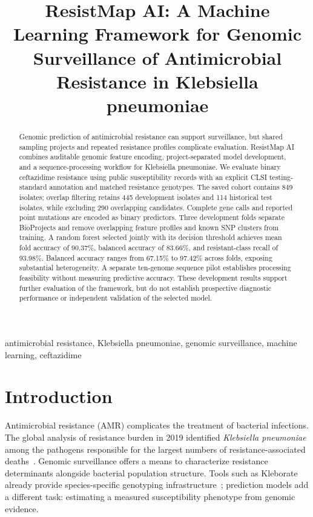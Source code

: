 \documentclass[conference]{IEEEtran}
\newcommand{\kp}{\textit{Klebsiella pneumoniae}}
\begin{document}
\title{ResistMap AI: A Machine Learning Framework for Genomic Surveillance of Antimicrobial Resistance in Klebsiella pneumoniae}
\author{
}
\maketitle
\begin{abstract}
Genomic prediction of antimicrobial resistance can support surveillance, but shared sampling projects and repeated resistance profiles complicate evaluation. ResistMap AI combines auditable genomic feature encoding, project-separated model development, and a sequence-processing workflow for Klebsiella pneumoniae. We evaluate binary ceftazidime resistance using public susceptibility records with an explicit CLSI testing-standard annotation and matched resistance genotypes. The saved cohort contains 849 isolates; overlap filtering retains 445 development isolates and 114 historical test isolates, while excluding 290 overlapping candidates. Complete gene calls and reported point mutations are encoded as binary predictors. Three development folds separate BioProjects and remove overlapping feature profiles and known SNP clusters from training. A random forest selected jointly with its decision threshold achieves mean fold accuracy of 90.37\%, balanced accuracy of 83.66\%, and resistant-class recall of 93.98\%. Balanced accuracy ranges from 67.15\% to 97.42\% across folds, exposing substantial heterogeneity. A separate ten-genome sequence pilot establishes processing feasibility without measuring predictive accuracy. These development results support further evaluation of the framework, but do not establish prospective diagnostic performance or independent validation of the selected model.
\end{abstract}
\begin{IEEEkeywords}
antimicrobial resistance, Klebsiella pneumoniae, genomic surveillance, machine learning, ceftazidime
\end{IEEEkeywords}

\section{Introduction}
Antimicrobial resistance (AMR) complicates the treatment of bacterial infections. The global analysis of resistance burden in 2019 identified \kp{} among the pathogens responsible for the largest numbers of resistance-associated deaths~\cite{burden}. Genomic surveillance offers a means to characterize resistance determinants alongside bacterial population structure. Tools such as Kleborate already provide species-specific genotyping infrastructure~\cite{kleborate}; prediction models add a different task: estimating a measured susceptibility phenotype from genomic evidence.
\end{document}
